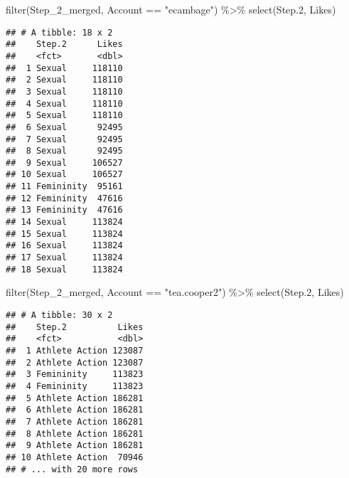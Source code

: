 \documentclass[
]{article}
\newenvironment{Shaded}{\begin{snugshade}}{\end{snugshade}}
\newcommand{\FloatTok}[1]{\textcolor[rgb]{0.00,0.00,0.81}{#1}}
\newcommand{\FunctionTok}[1]{\textcolor[rgb]{0.00,0.00,0.00}{#1}}
\newcommand{\NormalTok}[1]{#1}
\newcommand{\SpecialCharTok}[1]{\textcolor[rgb]{0.00,0.00,0.00}{#1}}
\newcommand{\StringTok}[1]{\textcolor[rgb]{0.31,0.60,0.02}{#1}}
\begin{document}
\begin{Shaded}
\begin{Highlighting}[]
\FunctionTok{filter}\NormalTok{(Step\_2\_merged, Account }\SpecialCharTok{==} \StringTok{"ecambage"}\NormalTok{) }\SpecialCharTok{\%\textgreater{}\%}
  \FunctionTok{select}\NormalTok{(Step}\FloatTok{.2}\NormalTok{, Likes)}
\end{Highlighting}
\end{Shaded}

\begin{verbatim}
## # A tibble: 18 x 2
##    Step.2      Likes
##    <fct>       <dbl>
##  1 Sexual     118110
##  2 Sexual     118110
##  3 Sexual     118110
##  4 Sexual     118110
##  5 Sexual     118110
##  6 Sexual      92495
##  7 Sexual      92495
##  8 Sexual      92495
##  9 Sexual     106527
## 10 Sexual     106527
## 11 Femininity  95161
## 12 Femininity  47616
## 13 Femininity  47616
## 14 Sexual     113824
## 15 Sexual     113824
## 16 Sexual     113824
## 17 Sexual     113824
## 18 Sexual     113824
\end{verbatim}

\begin{Shaded}
\begin{Highlighting}[]
\FunctionTok{filter}\NormalTok{(Step\_2\_merged, Account }\SpecialCharTok{==} \StringTok{"tea.cooper2"}\NormalTok{) }\SpecialCharTok{\%\textgreater{}\%}
  \FunctionTok{select}\NormalTok{(Step}\FloatTok{.2}\NormalTok{, Likes)}
\end{Highlighting}
\end{Shaded}

\begin{verbatim}
## # A tibble: 30 x 2
##    Step.2          Likes
##    <fct>           <dbl>
##  1 Athlete Action 123087
##  2 Athlete Action 123087
##  3 Femininity     113823
##  4 Femininity     113823
##  5 Athlete Action 186281
##  6 Athlete Action 186281
##  7 Athlete Action 186281
##  8 Athlete Action 186281
##  9 Athlete Action 186281
## 10 Athlete Action  70946
## # ... with 20 more rows
\end{verbatim}
\end{document}
